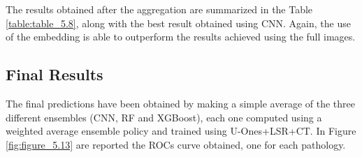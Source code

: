 The results obtained after the aggregation are summarized in the Table \ref{table:table_5.8}, along with the best result obtained using \acs{CNN}. Again, the use of the embedding is able to outperform the results achieved using the full images.

\begin{table}[h!]
\centering
{}
\caption[CNNs and XGBoost ensemble AUROC comparison]{AUROC values obtained using different Ensemble policies combining XGBoost models trained using the embeddings. For each label, the highest AUROC is boldfaced.}
\label{table:table_5.8}
\end{table}



\subsection{Final Results}

The final predictions have been obtained by making a simple average of the three different ensembles (CNN, RF and XGBoost), each one computed using a weighted average ensemble policy and trained using U-Ones+LSR+CT. In Figure \ref{fig:figure_5.13} are reported the ROCs curve obtained, one for each pathology.


